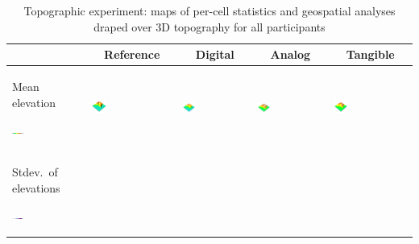 \documentclass[Afour,sageh,times]{sagej}
\newcommand{\ra}[1]{\renewcommand{\arraystretch}{#1}}
\begin{document}
\begin{table}[h]
\small\sf\centering
\caption{Topographic experiment: maps of per-cell statistics and geospatial analyses draped over 3D topography for all participants}
\ra{1.3}
\begin{tabular}{m{} m{} m{} m{} m{}}
\toprule
& \multicolumn{1}{c}{Reference} & \multicolumn{1}{c}{Digital} & \multicolumn{1}{c}{Analog}  & \multicolumn{1}{c}{Tangible}\\
\midrule
%
Mean elevation \par \vspace{0.5em} \includegraphics[width=0.16\textwidth]{images/legends/elevation_legend_1.pdf} & 
\includegraphics[width=0.18\textwidth]{images/render_3d/participants/dem_1.png} &
\includegraphics[width=0.18\textwidth]{images/render_3d/participants/mean_dem_1.png} &
\includegraphics[width=0.18\textwidth]{images/render_3d/participants/mean_dem_2.png} &
\includegraphics[width=0.18\textwidth]{images/render_3d/participants/mean_dem_3.png}\\
%
Stdev.~of elevations \par \vspace{0.5em} \includegraphics[width=0.16\textwidth]{images/legends/stdev_legend.pdf} & 

\end{tabular}
\end{table}
\end{document}
